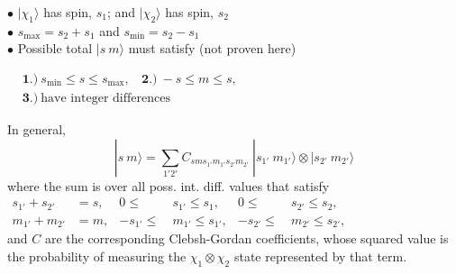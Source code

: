 \documentclass[12pt]{article}
\begin{document}
\vspace{5pt} \noindent
\begin{minipage}[t]{.6\textwidth}
    \setlength{\parindent}{.5cm}
    \noindent
    \(\bullet\) \(| \chi_1 \rangle\) has spin, \(s_1\); and \(| \chi_2 \rangle\) has spin, \(s_2\)\\[10pt]
    \(\bullet\) \(s_\text{max} = s_2 + s_1\) and \(s_\text{min} = s_2 - s_1\)\\[10pt]
    \(\bullet\) Possible total \(| s \ m \rangle\) must satisfy (not proven here)
    \begin{center}
        \(\begin{aligned}
            &\boldsymbol{1.)} \ s_\text{min} \leq s \leq s_\text{max},  
                \ \ \ \ \boldsymbol{2.)} \ -s \leq m \leq s, \\[5pt]
            &\boldsymbol{3.)} \ \text{have integer differences}
        \end{aligned}\)
    \end{center}

    \vspace{20pt} In general, 
    \[ \boxed{ | s \ m \rangle = \sum_{1'2'} C_{sms_{1'}m_{1'}s_{2'}m_{2'}} \ | s_{1'} \ m_{1'} \rangle 
        \otimes | s_{2'} \ m_{2'} \rangle } \] 
    where the sum is over all poss. int. diff. values that satisfy\\[10pt]
    \(\begin{aligned}
        s_{1'} + s_{2'} &= s,&        0 \leq \ &s_{1'} \leq s_1,&            0 \leq &\ s_{2'} \leq s_2, \\
        m_{1'} + m_{2'} &= m,&  -s_{1'} \leq \ &m_{1'} \leq s_{1'},&   -s_{2'} \leq &\ m_{2'} \leq s_{2'}, 
    \end{aligned}\)\\[10pt]
    and \(C\) are the corresponding Clebsh-Gordan coefficients, whose squared value is
    the probability of measuring the \(\chi_1 \otimes \chi_2\) state represented by that term.
\end{minipage}
\hspace{10pt}
\end{document}
